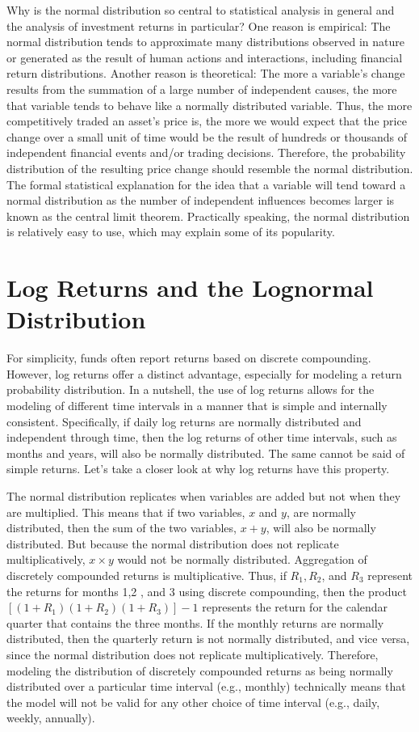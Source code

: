 \documentclass[11pt]{article}
\begin{document}
Why is the normal distribution so central to statistical analysis in general and the analysis of investment returns in particular? One reason is empirical: The normal distribution tends to approximate many distributions observed in nature or generated as the result of human actions and interactions, including financial return distributions. Another reason is theoretical: The more a variable's change results from the summation of a large number of independent causes, the more that variable tends to behave like a normally distributed variable. Thus, the more competitively traded an asset's price is, the more we would expect that the price change over a small unit of time would be the result of hundreds or thousands of independent financial events and/or trading decisions. Therefore, the probability distribution of the resulting price change should resemble the normal distribution. The formal statistical explanation for the idea that a variable will tend toward a normal distribution as the number of independent influences becomes larger is known as the central limit theorem. Practically speaking, the normal distribution is relatively easy to use, which may explain some of its popularity.

\section*{Log Returns and the Lognormal Distribution}
For simplicity, funds often report returns based on discrete compounding. However, log returns offer a distinct advantage, especially for modeling a return probability distribution. In a nutshell, the use of log returns allows for the modeling of different time intervals in a manner that is simple and internally consistent. Specifically, if daily log returns are normally distributed and independent through time, then the log returns of other time intervals, such as months and years, will also be normally distributed. The same cannot be said of simple returns. Let's take a closer look at why log returns have this property.

The normal distribution replicates when variables are added but not when they are multiplied. This means that if two variables, $x$ and $y$, are normally distributed, then the sum of the two variables, $x+y$, will also be normally distributed. But because the normal distribution does not replicate multiplicatively, $x \times y$ would not be normally distributed. Aggregation of discretely compounded returns is multiplicative. Thus, if $R_{1}, R_{2}$, and $R_{3}$ represent the returns for months 1,2 , and 3 using discrete compounding, then the product $\left[\left(1+R_{1}\right)\left(1+R_{2}\right)\left(1+R_{3}\right)\right]-1$ represents the return for the calendar quarter that contains the three months. If the monthly returns are normally distributed, then the quarterly return is not normally distributed, and vice versa, since the normal distribution does not replicate multiplicatively. Therefore, modeling the distribution of discretely compounded returns as being normally distributed over a particular time interval (e.g., monthly) technically means that the model will not be valid for any other choice of time interval (e.g., daily, weekly, annually).
\end{document}
